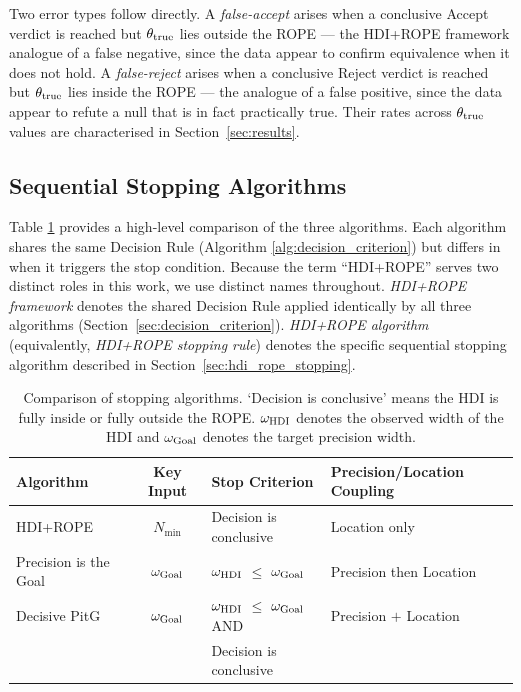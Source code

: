 Two error types follow directly.
A \textit{false-accept} arises when a conclusive Accept verdict is reached but
$\theta_{\rm true}$ lies outside the ROPE --- the HDI+ROPE framework analogue of a false
negative, since the data appear to confirm equivalence when it does not hold.
A \textit{false-reject} arises when a conclusive Reject verdict is reached but
$\theta_{\rm true}$ lies inside the ROPE --- the analogue of a false positive, since
the data appear to refute a null that is in fact practically true.
Their rates across $\theta_{\rm true}$ values are characterised in
Section~\ref{sec:results}.

\subsection{Sequential Stopping Algorithms}\label{sec:sequential_stopping_algorithms}

Table \ref{tab:comparison} provides a high-level comparison of the three algorithms.
Each algorithm shares the same Decision Rule (Algorithm \ref{alg:decision_criterion})
but differs in when it triggers the stop condition.
Because the term ``HDI+ROPE'' serves two distinct roles in this work, we use distinct names
throughout. \textit{HDI+ROPE framework} denotes the shared Decision Rule applied
identically by all three algorithms (Section~\ref{sec:decision_criterion}).
\textit{HDI+ROPE algorithm} (equivalently, \textit{HDI+ROPE stopping rule}) denotes
the specific sequential stopping algorithm described in
Section~\ref{sec:hdi_rope_stopping}.

\begin{table}[h!]
    \begin{center}
      \begin{tabular}{l|c|l|l}
        \textbf{Algorithm} & \textbf{Key Input} & \textbf{Stop Criterion} &  \textbf{Precision/Location Coupling} \\
        \hline
        HDI+ROPE & $N_\mathrm{min}$ & Decision is conclusive & Location only \\
        Precision is the Goal & $\omega_{\rm Goal}$ & $\omega_{\rm HDI}$ $\le$ $\omega_{\rm Goal}$ & Precision then Location \\
        Decisive PitG & $\omega_{\rm Goal}$ & $\omega_{\rm HDI}$ $\le$ $\omega_{\rm Goal}$ AND & Precision $+$ Location \\
         & & Decision is conclusive & \\
      \end{tabular}
      \caption{Comparison of stopping algorithms. `Decision is conclusive' means the HDI
      is fully inside or fully outside the ROPE. $\omega_{\rm HDI}$ denotes the observed
      width of the HDI and $\omega_{\rm Goal}$ denotes the target precision width.}
      \label{tab:comparison}
    \end{center}
  \end{table}

